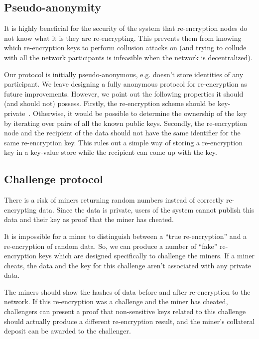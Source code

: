 \documentclass[longbibliography,nofootinbib]{revtex4-1}
\begin{document}
\subsection{Pseudo-anonymity}
\label{sec:anonymity}

It is highly beneficial for the security of the system that re-encryption nodes do not know what it is they are re-encrypting.
This prevents them from knowing which re-encryption keys to perform collusion attacks on (and trying to collude with all the network participants
is infeasible when the network is decentralized).

Our protocol is initially pseudo-anonymous, e.g. doesn't store identities of any participant.
We leave designing a fully anonymous protocol for re-encryption as future improvements.
However, we point out the following properties it should (and should not) possess.
Firstly, the re-encryption scheme should be key-private~\cite{Ateniese-key-private,lwe-reencryption}.
Otherwise, it would be possible to determine the ownership of the key by iterating over pairs of all the known public keys.
Secondly, the re-encryption node and the recipient of the data should not have the same identifier for the same re-encryption key.
This rules out a simple way of storing a re-encryption key in a key-value store while the recipient can come up with the key.

\subsection{Challenge protocol}
\label{sec:challenge-protocol}

There is a risk of miners returning random numbers instead of correctly re-encrypting data.
Since the data is private, users of the system cannot publish this data and their key as proof that the miner has cheated.

It is impossible for a miner to distinguish between a ``true re-encryption'' and a re-encryption of random data.
So, we can produce a number of ``fake'' re-encryption keys which are designed specifically to challenge the miners.
If a miner cheats, the data and the key for this challenge aren't associated with any private data.

The miners should show the hashes of data before and after re-encryption to the network.
If this re-encryption was a challenge and the miner has cheated, challengers can present a proof that non-sensitive keys related to this challenge should actually
produce a different re-encryption result, and the miner's collateral deposit can be awarded to the challenger.
\end{document}
